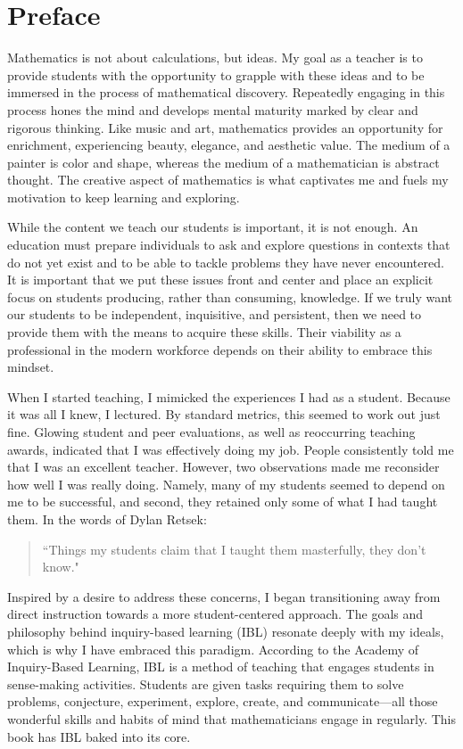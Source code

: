 \chapter*{Preface}

Mathematics is not about calculations, but ideas. My goal as a teacher is to provide students with the opportunity to grapple with these ideas and to be immersed in the process of mathematical discovery. Repeatedly engaging in this process hones the mind and develops mental maturity marked by clear and rigorous thinking. Like music and art, mathematics provides an opportunity for enrichment, experiencing beauty, elegance, and aesthetic value. The medium of a painter is color and shape, whereas the medium of a mathematician is abstract thought. The creative aspect of mathematics is what captivates me and fuels my motivation to keep learning and exploring.

While the content we teach our students is important, it is not enough. An education must prepare individuals to ask and explore questions in contexts that do not yet exist and to be able to tackle problems they have never encountered. It is important that we put these issues front and center and place an explicit focus on students producing, rather than consuming, knowledge. If we truly want our students to be independent, inquisitive, and persistent, then we need to provide them with the means to acquire these skills. Their viability as a professional in the modern workforce depends on their ability to embrace this mindset.

When I started teaching, I mimicked the experiences I had as a student. Because it was all I knew, I lectured. By standard metrics, this seemed to work out just fine. Glowing student and peer evaluations, as well as reoccurring teaching awards, indicated that I was effectively doing my job. People consistently told me that I was an excellent teacher. However, two observations made me reconsider how well I was really doing. Namely, many of my students seemed to depend on me to be successful, and second, they retained only some of what I had taught them. In the words of Dylan Retsek:
\begin{quotation}
``Things my students claim that I taught them masterfully, they don't know."
\end{quotation}
Inspired by a desire to address these concerns, I began transitioning away from direct instruction towards a more student-centered approach. The goals and philosophy behind inquiry-based learning (IBL) resonate deeply with my ideals, which is why I have embraced this paradigm. According to the Academy of Inquiry-Based Learning, IBL is a method of teaching that engages students in sense-making activities. Students are given tasks requiring them to solve problems, conjecture, experiment, explore, create, and communicate---all those wonderful skills and habits of mind that mathematicians engage in regularly. This book has IBL baked into its core.

